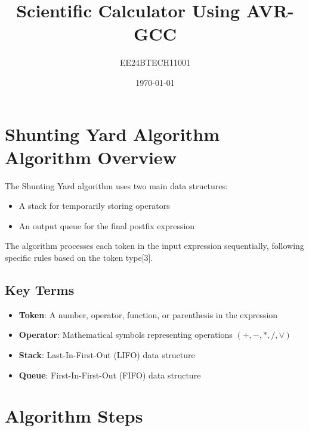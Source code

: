 \documentclass[a4paper,12pt]{article}
\title{Scientific Calculator Using AVR-GCC}
\author{EE24BTECH11001}
\date{\today}
\begin{document}
\maketitle

\section{Shunting Yard Algorithm Algorithm Overview}

The Shunting Yard algorithm uses two main data structures:
\begin{itemize}
    \item A stack for temporarily storing operators
    \item An output queue for the final postfix expression
\end{itemize}

The algorithm processes each token in the input expression sequentially, following specific rules based on the token type[3].

\subsection{Key Terms}

\begin{itemize}
    \item \textbf{Token}: A number, operator, function, or parenthesis in the expression
    \item \textbf{Operator}: Mathematical symbols representing operations $(+, -, *, /, \vee)$
    \item \textbf{Stack}: Last-In-First-Out (LIFO) data structure
    \item \textbf{Queue}: First-In-First-Out (FIFO) data structure
\end{itemize}

\section{Algorithm Steps}
\end{document}
